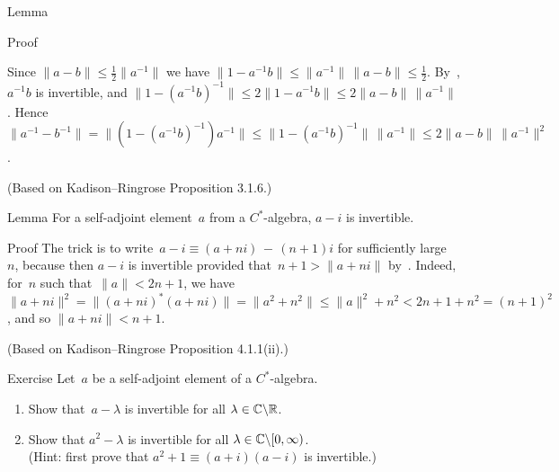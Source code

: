 \documentclass[main]{subfiles}
\begin{document}
\begin{parsec}
\begin{point}{Lemma}
\begin{point}{Proof}
\begin{point}
Since $\|a-b\|\leq \frac{1}{2}\|a^{-1}\|$
we have
$\|1-a^{-1}b\|\leq \|a^{-1}\|\,\|a-b\|\leq \frac{1}{2}$.
By~, $a^{-1}b$ is invertible,
and $\|1-(a^{-1}b)^{-1}\|\leq 2\|1-a^{-1}b\|\leq 2\|a-b\|\,\|a^{-1}\|$.
Hence $\|a^{-1}-b^{-1}\| = \|(1-(a^{-1}b)^{-1})a^{-1}\|
\leq \|1-(a^{-1}b)^{-1}\|\,\|a^{-1}\|\leq 2 \|a-b\|\,\|a^{-1}\|^2$.

(Based on Kadison--Ringrose Proposition 3.1.6.)
\end{point}
\end{point}
\end{point}
%
%
\begin{point}{Lemma}%
For a self-adjoint element~$a$ from a $C^*$-algebra,
$a-i$ is invertible.
\begin{point}{Proof}%
The trick
is to 
write~$a-i\equiv (a+ni)\,-\,(n+1)i$
for sufficiently large~$n$,
because  
then
$a-i$
is invertible provided that~$n+1 > \|a+ni\|$
by~.
Indeed, for~$n$ such that~$\|a\|<2n+1$,
we have $\|a+ni\|^2 = \|(a+ni)^*(a+ni)\|
= \|a^2+n^2\|
\leq \|a\|^2+n^2 < 2n+1+n^2 = (n+1)^2$,
and so $\|a+ni\| < n+1$.

(Based on Kadison--Ringrose Proposition 4.1.1(ii).)
\end{point}
\begin{point}{Exercise}%
Let~$a$ be a self-adjoint element of a $C^*$-algebra.
\begin{enumerate}
\item
Show that~$a-\lambda$ is invertible for all $\lambda\in \mathbb{C}\backslash \mathbb{R}$.
\item
Show that $a^2-\lambda$ is invertible for all 
$\lambda\in \mathbb{C}\backslash[0,\infty)$.\\
(Hint: first prove that
 $a^2+1 \equiv (a+i)(a-i)$ is invertible.)


\end{enumerate}
\end{point}
\end{point}
\end{parsec}
\end{document}
